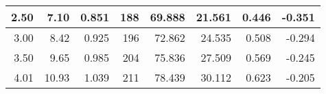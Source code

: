 \begin{table}[h]
\begin{tabular}{|r|r|r|r|r|r|r|r|}
		2.50                                                                                                  & 7.10                                                                                                         & 0.851                                             & 188                                                                                                    & 69.888                                                                                          & 21.561                                               & 0.446                                                    & -0.351                                                \\ \hline
		3.00                                                                                                  & 8.42                                                                                                         & 0.925                                             & 196                                                                                                    & 72.862                                                                                          & 24.535                                               & 0.508                                                    & -0.294                                                \\ \hline
		3.50                                                                                                  & 9.65                                                                                                         & 0.985                                             & 204                                                                                                    & 75.836                                                                                          & 27.509                                               & 0.569                                                    & -0.245                                                \\ \hline
		4.01                                                                                                  & 10.93                                                                                                        & 1.039                                             & 211                                                                                                    & 78.439                                                                                          & 30.112                                               & 0.623                                                    & -0.205                                                \\ \hline

\end{tabular}
\end{table}
